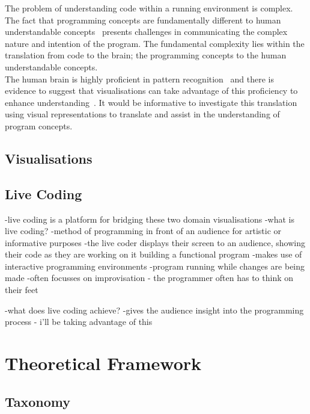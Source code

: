 The problem of understanding code within a running environment is complex. The fact that programming concepts are fundamentally different to human understandable concepts~\cite{Biggerstaff1994} presents challenges in communicating the complex nature and intention of the program. The fundamental complexity lies within the translation from code to the brain; the programming concepts to the human understandable concepts.\\

The human brain is highly proficient in pattern recognition~\cite{ware2013information} and there is evidence to suggest that visualisations can take advantage of this proficiency to enhance understanding~\cite{najjar1998principles}. It would be informative to investigate this translation using visual representations to translate and assist in the understanding of program concepts.\\

\subsection{Visualisations}


\subsection{Live Coding}

-live coding is a platform for bridging these two domain visualisations 
-what is live coding?
-method of programming in front of an audience for artistic or informative purposes
-the live coder displays their screen to an audience, showing their code as they are working on it building a functional program
-makes use of interactive programming environments 
-program running while changes are being made 
-often focusses on improvisation - the programmer often has to think on their feet

-what does live coding achieve?
-gives the audience insight into the programming process - i’ll be taking advantage of this


\section{Theoretical Framework}
\label{sec:framework}


\subsection{Taxonomy}


